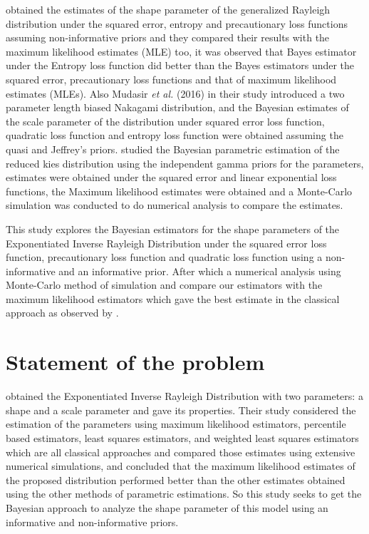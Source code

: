 \documentclass[a4paper,12pt]{report}
\newcommand{\para}{\hspace{0.5cm}}
\begin{document}
\noindent\para \cite{aliyu2016bayesian} obtained the estimates of the shape parameter of the generalized Rayleigh distribution under the squared error, entropy and precautionary loss functions assuming non-informative priors and they compared their results with the maximum likelihood estimates (MLE) too, it was observed that Bayes estimator under the Entropy loss function did better than the Bayes estimators under the squared error, precautionary loss functions and that of maximum likelihood estimates (MLEs). Also Mudasir \textit{et al.} (2016) in their study introduced a two parameter length biased Nakagami distribution, and the Bayesian estimates of the scale parameter of the distribution under squared error loss function, quadratic loss function and entropy loss function were obtained assuming the quasi and Jeffrey’s priors. \cite{usta2019bayesian} studied the Bayesian parametric estimation of the reduced kies distribution using the independent gamma priors for the parameters, estimates were obtained under the squared error and linear exponential loss functions, the Maximum likelihood estimates were obtained and a Monte-Carlo simulation was conducted to do numerical analysis to compare the estimates.

\noindent\para This study explores the Bayesian estimators for the shape parameters of the Exponentiated Inverse Rayleigh Distribution under the squared error loss function, precautionary loss function and quadratic loss function using a non-informative and an informative prior. After which a numerical analysis using Monte-Carlo method of simulation and compare our estimators with the maximum likelihood estimators which gave the best estimate in the classical approach as observed by \cite{rao2019exponentiated}.

\section{Statement of the problem}
\noindent\para \cite{rao2019exponentiated} obtained the Exponentiated Inverse Rayleigh Distribution with two parameters: a shape and a scale parameter and gave its properties. Their study considered the estimation of the parameters using maximum likelihood estimators, percentile based estimators, least squares estimators, and weighted least squares estimators which are all classical approaches and compared those estimates using extensive numerical simulations, and concluded that the maximum likelihood estimates of the proposed distribution performed better than the other estimates obtained using the other methods of parametric estimations. So this study seeks to get the Bayesian approach to analyze the shape parameter of this model using an informative and non-informative priors.
\end{document}

